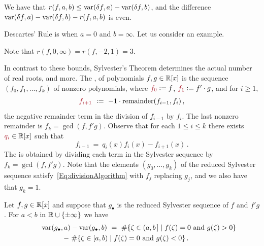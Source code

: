 \begin{theorem}
  We have that $r(f,a,b)\leq \operatorname{{\rm var}}(\delta f,a) -\operatorname{{\rm var}}(\delta f,b)$, and the difference
  $\operatorname{{\rm var}}(\delta f,a) -\operatorname{{\rm var}}(\delta f,b)-r(f,a,b)$ is even. 
\end{theorem}

Descartes' Rule is when $a=0$ and $b=\infty$.
Let us consider an example.
%
\begin{leftbar}

\end{leftbar}
%
Note that $r(f,0,\infty)=r(f,-2,1)=3$.

In contrast to these bounds, 
Sylvester's Theorem determines the actual number of real roots, and more.
The ,  of polynomials $f,g\in\mathbb{R}[x]$ is the sequence
$\left(f_0,f_1,\dotsc,f_k\right)$ of nonzero polynomials, where $\defcolor{f_0}\vcentcolon= f$, $\defcolor{f_1}\vcentcolon= f'\cdot g$,
and for $i\geq 1$, 
%
  \[
    \defcolor{f_{i+1}}\ \vcentcolon=\ -1\cdot \mbox{remainder}(f_{i-1},f_i)\,,
  \]
%
the negative remainder term in the division of $f_{i-1}$ by $f_i$. 
The last nonzero remainder is $f_k = \gcd(f,f'g)$.
Observe that for each $1\leq i\leq k$ there exists $\defcolor{q_i}\in\RR[x]$ such that
%
 \begin{equation}\label{Eq:divisionAlgorithm}
    f_{i-1}\ =\ q_i(x)f_i(x)-f_{i+1}(x)\,.
 \end{equation}
%
The  is obtained by dividing each term in the Sylvester sequence by $f_k=\gcd(f,f'g)$.
Note that the elements $(g_0,\dotsc,g_k)$ of the reduced Sylvester sequence satisfy~\eqref{Eq:divisionAlgorithm} with $f_j$ replacing $g_j$,
and we also have that $g_k=1$. 

\begin{theorem}[Sylvester]
  \label{Th:Sylvester}
  Let $f,g\in\mathbb{R}[x]$ and suppose that $g_\bullet$ is the reduced Sylvester sequence of $f$ and $f'g$.
  For $a<b$ in $\mathbb{R}\cup\{\pm\infty\}$ we have
  \begin{multline*}
    \qquad\operatorname{{\rm var}}(g_\bullet,a)-\operatorname{{\rm var}}(g_\bullet,b)\ =\
    \#\{\zeta\in(a,b\hspace{.05cm}]\mid f(\zeta)=0\mbox{ and } g(\zeta)>0\}\\
      \ -\
    \#\{\zeta\in[a,b)\mid f(\zeta)=0\mbox{ and } g(\zeta)<0\}\,.\qquad
  \end{multline*}
\end{theorem}

